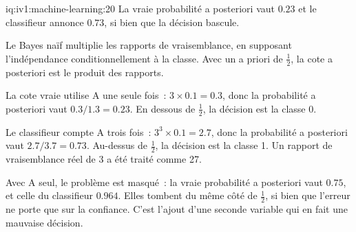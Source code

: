 \begin{solution}{iq:iv1:machine-learning:20}
La vraie probabilité a posteriori vaut $0.23$ et le classifieur annonce $0.73$, si bien que la décision bascule.

Le Bayes naïf multiplie les rapports de vraisemblance, en supposant l'indépendance conditionnellement à la classe. Avec un a priori de $\frac12$, la cote a posteriori est le produit des rapports.

La cote vraie utilise A une seule fois~: $3 \times 0.1 = 0.3$, donc la probabilité a posteriori vaut $0.3/1.3 = 0.23$. En dessous de $\frac12$, la décision est la classe 0.

Le classifieur compte A trois fois~: $3^3 \times 0.1 = 2.7$, donc la probabilité a posteriori vaut $2.7/3.7 = 0.73$. Au-dessus de $\frac12$, la décision est la classe 1. Un rapport de vraisemblance réel de 3 a été traité comme 27.

Avec A seul, le problème est masqué~: la vraie probabilité a posteriori vaut $0.75$, et celle du classifieur $0.964$. Elles tombent du même côté de $\frac12$, si bien que l'erreur ne porte que sur la confiance. C'est l'ajout d'une seconde variable qui en fait une mauvaise décision.



\end{solution}

